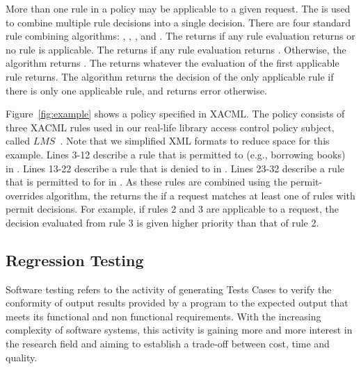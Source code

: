 More than one rule in a policy may be applicable to a given request.
The  is used to combine multiple
rule decisions into a single decision. There are four standard rule
combining algorithms: , , , and . The
 returns  if any rule
evaluation returns  or no rule is applicable. The
 returns  if any
rule evaluation returns . Otherwise, the algorithm
returns .
The  returns whatever the
evaluation of the first applicable rule returns. The
 algorithm returns the decision of the only
applicable rule if there is only one applicable rule, and returns
error otherwise.

Figure~\ref{fig:example} shows a policy specified
in XACML. The policy consists of three XACML rules used in our real-life library access
control policy subject, called $LMS$~\cite{mouelhi09:tranforming}.
Note that we simplified XML formats to reduce
space for this example.
Lines 3-12 describe a rule that  is permitted to  (e.g., borrowing books)  in .
Lines 13-22 describe a rule that  is denied to   in .
Lines 23-32 describe a rule that  is permitted to  for  in .
As these rules are combined using the permit-overrides algorithm, the  returns the  if
 a request matches at least one of rules with permit decisions. For example, if rules 2 and 3 are applicable to a request, the decision
evaluated from rule 3 is given higher priority than that of rule 2.


\subsection{Regression Testing}
Software testing \cite{Myers:1979:AST:539883} refers to the activity of generating Tests Cases to verify the conformity of output results provided by a 
program to the expected output that meets its functional and non functional requirements. With the increasing complexity of software systems, 
this activity is gaining more and more interest in the research field and aiming to establish a trade-off between cost, time and quality. 

